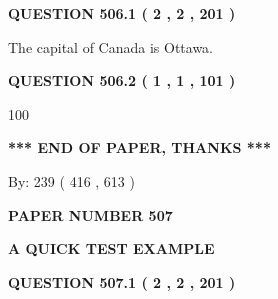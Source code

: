 \documentclass[12pt]{article}
\begin{document}
{\textbf{\Large{QUESTION
506.1 
 ( 2 , 2 , 201 )
}}}
  
  
 
 
\noindent{}
 
 
The capital of Canada is Ottawa.
 
 
 
 
  
\vspace{0.2in}
  
{\textbf{\Large{QUESTION
506.2 
 ( 1 , 1 , 101 )
}}}
  
  
 
 
\noindent{}

100
 
 
   
   
 \vspace{0.2in}
 
   
   
   
   
\vspace{1.0in} 
{\textbf{\large{ *** END OF PAPER, THANKS *** }}} 
   
   
\hspace{1.0in} By: 
 239 ( 416 ,  613 )
   
   
   
   
\newpage 
\setcounter{page}{ 
   507001 } 
   
   
   
   
 {\textbf{ \Large{ PAPER NUMBER  507  }}}
   
   
\vspace{0.2in}
   
   
   
   
   
   
 \vspace{0.2in}
{\LARGE {\textbf{ A QUICK TEST EXAMPLE}}}
   
   
  
\vspace{0.2in}
  
{\textbf{\Large{QUESTION
507.1 
 ( 2 , 2 , 201 )
}}}
  
  
 
 
\noindent{}
 
\end{document}

